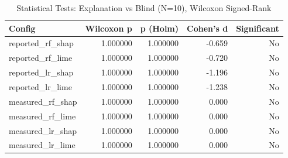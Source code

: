 \begin{table}[htbp]
  \centering
  \caption{Statistical Tests: Explanation vs Blind (N=10), Wilcoxon Signed-Rank}
  \label{tab:stats}
  \small
  \begin{tabular}{lrrrr}
    \toprule
    Config & Wilcoxon p & p (Holm) & Cohen's d & Significant \\
    \midrule
    reported\_rf\_shap & 1.000000 & 1.000000 & -0.659 & No \\
    reported\_rf\_lime & 1.000000 & 1.000000 & -0.720 & No \\
    reported\_lr\_shap & 1.000000 & 1.000000 & -1.196 & No \\
    reported\_lr\_lime & 1.000000 & 1.000000 & -1.238 & No \\
    measured\_rf\_shap & 1.000000 & 1.000000 & 0.000 & No \\
    measured\_rf\_lime & 1.000000 & 1.000000 & 0.000 & No \\
    measured\_lr\_shap & 1.000000 & 1.000000 & 0.000 & No \\
    measured\_lr\_lime & 1.000000 & 1.000000 & 0.000 & No \\
    \bottomrule
  \end{tabular}
\end{table}
